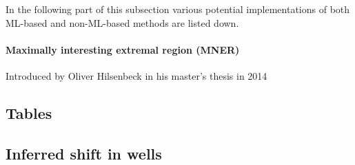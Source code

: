 \documentclass[pdftex,12pt,a4paper]{report}
\begin{document}
In the following part of this subsection various potential implementations of both ML-based and non-ML-based methods are listed down.

\subsubsection*{Maximally interesting extremal region (MNER)}

Introduced by Oliver Hilsenbeck in his master's thesis in 2014 \cite{hilsenbeck2014maximally} %








\begin{appendices}
\newpage

\chapter{Tables}
\label{chapter:appendix_tables}

\section{Inferred shift in wells}


\end{appendices}
\end{document}
